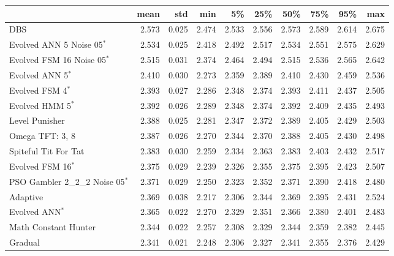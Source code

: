 \begin{tabular}{lrrrrrrrrr}
\toprule
{} &   mean &    std &    min &     5\% &    25\% &    50\% &    75\% &    95\% &    max \\
\midrule
DBS                              &  2.573 &  0.025 &  2.474 &  2.533 &  2.556 &  2.573 &  2.589 &  2.614 &  2.675 \\
Evolved ANN 5 Noise 05$^{*}$     &  2.534 &  0.025 &  2.418 &  2.492 &  2.517 &  2.534 &  2.551 &  2.575 &  2.629 \\
Evolved FSM 16 Noise 05$^{*}$    &  2.515 &  0.031 &  2.374 &  2.464 &  2.494 &  2.515 &  2.536 &  2.565 &  2.642 \\
Evolved ANN 5$^{*}$              &  2.410 &  0.030 &  2.273 &  2.359 &  2.389 &  2.410 &  2.430 &  2.459 &  2.536 \\
Evolved FSM 4$^{*}$              &  2.393 &  0.027 &  2.286 &  2.348 &  2.374 &  2.393 &  2.411 &  2.437 &  2.505 \\
Evolved HMM 5$^{*}$              &  2.392 &  0.026 &  2.289 &  2.348 &  2.374 &  2.392 &  2.409 &  2.435 &  2.493 \\
Level Punisher                   &  2.388 &  0.025 &  2.281 &  2.347 &  2.372 &  2.389 &  2.405 &  2.429 &  2.503 \\
Omega TFT: 3, 8                  &  2.387 &  0.026 &  2.270 &  2.344 &  2.370 &  2.388 &  2.405 &  2.430 &  2.498 \\
Spiteful Tit For Tat             &  2.383 &  0.030 &  2.259 &  2.334 &  2.363 &  2.383 &  2.403 &  2.432 &  2.517 \\
Evolved FSM 16$^{*}$             &  2.375 &  0.029 &  2.239 &  2.326 &  2.355 &  2.375 &  2.395 &  2.423 &  2.507 \\
PSO Gambler 2\_2\_2 Noise 05$^{*}$ &  2.371 &  0.029 &  2.250 &  2.323 &  2.352 &  2.371 &  2.390 &  2.418 &  2.480 \\
Adaptive                         &  2.369 &  0.038 &  2.217 &  2.306 &  2.344 &  2.369 &  2.395 &  2.431 &  2.524 \\
Evolved ANN$^{*}$                &  2.365 &  0.022 &  2.270 &  2.329 &  2.351 &  2.366 &  2.380 &  2.401 &  2.483 \\
Math Constant Hunter             &  2.344 &  0.022 &  2.257 &  2.308 &  2.329 &  2.344 &  2.359 &  2.382 &  2.445 \\
Gradual                          &  2.341 &  0.021 &  2.248 &  2.306 &  2.327 &  2.341 &  2.355 &  2.376 &  2.429 \\
\bottomrule
\end{tabular}

